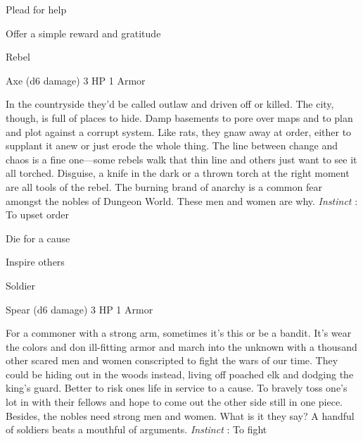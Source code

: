 \startitemize[1,packed]
         
\item Plead for help

         
\item Offer a simple reward and gratitude

       
\stopitemize
       
\startMonsterName
Rebel	 
\stopMonsterName
       

Axe (d6 damage)	3 HP	1 Armor

       


       
\startMonsterDescription
In the countryside they’d be called outlaw and driven off or killed. The city, though, is full of places to hide. Damp basements to pore over maps and to plan and plot against a corrupt system. Like rats, they gnaw away at order, either to supplant it anew or just erode the whole thing. The line between change and chaos is a fine one—some rebels walk that thin line and others just want to see it all torched. Disguise, a knife in the dark or a thrown torch at the right moment are all tools of the rebel. The burning brand of anarchy is a common fear amongst the nobles of Dungeon World. These men and women are why. {\em Instinct} : To upset order
\stopMonsterDescription
       
\startitemize[1,packed]
         
\item Die for a cause

         
\item Inspire others

       
\stopitemize
       
\startMonsterName
Soldier	 
\stopMonsterName
       

Spear (d6 damage)	3 HP	1 Armor

       


       
\startMonsterDescription
For a commoner with a strong arm, sometimes it’s this or be a bandit. It’s wear the colors and don ill-fitting armor and march into the unknown with a thousand other scared men and women conscripted to fight the wars of our time. They could be hiding out in the woods instead, living off poached elk and dodging the king’s guard. Better to risk ones life in service to a cause. To bravely toss one’s lot in with their fellows and hope to come out the other side still in one piece. Besides, the nobles need strong men and women. What is it they say? A handful of soldiers beats a mouthful of arguments. {\em Instinct} : To fight
\stopMonsterDescription
       
